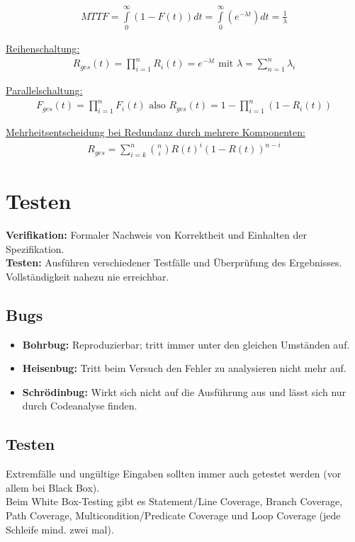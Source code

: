 \begin{align*}
	MTTF = \int\limits_{0}^\infty (1-F(t)) dt = \int\limits_{0}^\infty (e^{-\lambda t}) dt = \frac{1}{\lambda}
\end{align*}

\underline{Reihenschaltung:}
\begin{align*}
	R_{ges}(t)=\prod\limits_{i=1}^nR_i(t)=e^{-\lambda t} \text{ mit } \lambda=\sum\limits_{n=1}^n\lambda_i
\end{align*}

\underline{Parallelschaltung:}
\begin{align*}
	F_{ges}(t)=\prod\limits_{i=1}^nF_i(t) \text{ also } R_{ges}(t)=1-\prod\limits_{i=1}^n(1-R_i(t))
\end{align*}

\underline{Mehrheitsentscheidung bei Redundanz durch mehrere Komponenten:}
\begin{align*}
	R_{ges}=\sum\limits_{i=k}^n\binom{n}{i}R(t)^i(1-R(t))^{n-i}
\end{align*}

\chapter{Testen}
\textbf{Verifikation:} Formaler Nachweis von Korrektheit und Einhalten der Spezifikation.\\
\textbf{Testen:} Ausführen verschiedener Testfälle und Überprüfung des Ergebnisses. Vollständigkeit nahezu nie erreichbar.

\section{Bugs}
\begin{itemize}
	\item \textbf{Bohrbug:} Reproduzierbar; tritt immer unter den gleichen Umständen auf.
	\item \textbf{Heisenbug:} Tritt beim Versuch den Fehler zu analysieren nicht mehr auf.
	\item \textbf{Schrödinbug:} Wirkt sich nicht auf die Ausführung aus und lässt sich nur durch Codeanalyse finden.
\end{itemize}

\section{Testen}
Extremfälle und ungültige Eingaben sollten immer auch getestet werden (vor allem bei Black Box).\\Beim White Box-Testing gibt es Statement/Line Coverage, Branch Coverage, Path Coverage, Multicondition/Predicate Coverage und Loop Coverage (jede Schleife mind. zwei mal).

